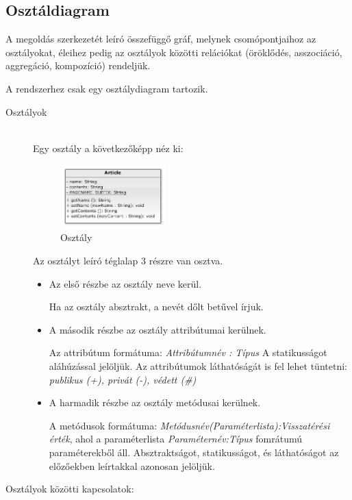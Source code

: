 \documentclass[margin=0px]{article}
\begin{document}
\subsection{Osztáldiagram}
A megoldás szerkezetét leíró összefüggő gráf, melynek csomópontjaihoz az osztályokat, éleihez pedig az osztályok közötti relációkat (öröklődés, asszociáció, aggregáció, kompozíció) rendeljük.

\noindent
A rendszerhez csak egy osztálydiagram tartozik.

\begin{description}
    \item[Osztályok] \hfill \\

        Egy osztály a következőképp néz ki:
        \begin{figure}[H]
            \centering
            \includegraphics[width=0.4\textwidth]{img/osztaly.png}
            \caption{Osztály}
        \end{figure}

        Az osztályt leíró téglalap 3 részre van osztva.
        \begin{itemize}
            \item Az első részbe az osztály neve kerül.

                  Ha az osztály absztrakt, a nevét dőlt betűvel írjuk.

            \item A második részbe az osztály attribútumai kerülnek.

                  Az attribútum formátuma: \textit{Attribútumnév : Típus}
                  A statikusságot aláhúzással jelöljük.
                  Az attribútumok láthatóságát is fel lehet tüntetni: \textit{ publikus (+), privát (-), védett (\#)}

            \item A harmadik részbe az osztály metódusai kerülnek.

                  A metódusok formátuma: \textit{Metódusnév(Paraméterlista):Visszatérési érték}, ahol a paraméterlista \textit{Paraméternév:Típus} fomrátumú paraméterekből áll.
                  Absztraktságot, statikusságot, és láthatóságot az előzőekben leírtakkal azonosan jelöljük.
        \end{itemize}
    \item[Osztályok közötti kapcsolatok:] \hfill \\


\end{description}
\end{document}
